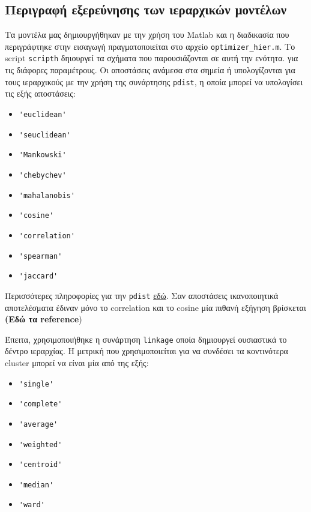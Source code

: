 \subsection{Περιγραφή εξερεύνησης των ιεραρχικών μοντέλων}
Τα μοντέλα μας δημιουργήθηκαν με την χρήση του Matlab και η διαδικασία που περιγράφτηκε στην εισαγωγή πραγματοποιείται στο αρχείο \texttt{optimizer\_hier.m}.
Το script \texttt{scripth} δηιουργεί τα σχήματα που παρουσιάζονται σε αυτή την ενότητα.
για τις διάφορες παραμέτρους. Οι αποστάσεις ανάμεσα στα σημεία ή υπολογίζονται για τους ιεραρχικούς με την χρήση της συνάρτησης \lstinline!pdist!, η οποία μπορεί να υπολογίσει τις εξής αποστάσεις:
\begin{itemize}
    \item \lstinline!'euclidean'!
    \item \lstinline!'seuclidean'!
    \item \lstinline!'Mankowski'!
    \item \lstinline!'chebychev'!
    \item \lstinline!'mahalanobis'!
    \item \lstinline!'cosine'!
    \item \lstinline!'correlation'!
    \item \lstinline!'spearman'!
    \item \lstinline!'jaccard'!
\end{itemize}

Περισσότερες πληροφορίες για την \lstinline!pdist!
\href{http://www.mathworks.com/help/stats/pdist.html}{εδώ}.
Σαν αποστάσεις ικανοποιητικά αποτελέσματα έδιναν μόνο το correlation και το 
cosine μία πιθανή εξήγηση βρίσκεται \textbf{(Εδώ τα reference})

Έπειτα, χρησιμοποιήθηκε η συνάρτηση \lstinline!linkage! οποία δημιουργεί ουσιαστικά το δέντρο ιεραρχίας.
Η μετρική που χρησιμοποιείται για να συνδέσει τα κοντινότερα cluster μπορεί να είναι μία από της εξής:
\begin{itemize}
    \item \lstinline!'single'!
    \item \lstinline!'complete'!
    \item \lstinline!'average'!
    \item \lstinline!'weighted'!
    \item \lstinline!'centroid'!
    \item \lstinline!'median'!
    \item \lstinline!'ward'! 
\end{itemize}

